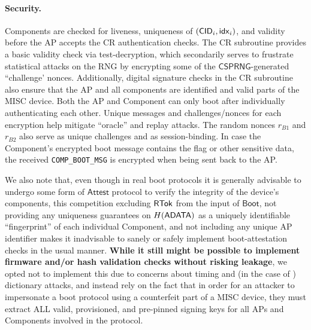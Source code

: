 \paragraph{Security.} Components are checked for liveness, uniqueness of $(\mathsf{CID}_i, \mathsf{idx}_i)$, and validity before the AP accepts the CR authentication checks. The CR subroutine provides a basic validity check via test-decryption, which secondarily serves to frustrate statistical attacks on the RNG \iflong by encrypting some of the $\mathsf{CSPRNG}$-generated ``challenge' nonces\fi. Additionally, digital signature checks in the CR subroutine also ensure that the AP and all components are identified and valid parts of the MISC device. Both the AP and Component can only boot after individually authenticating each other. Unique messages and challenges/nonces for each encryption help mitigate ``oracle'' and replay attacks. The random nonces $r_{B1}$ and $r_{B2}$ also serve as unique challenges and as session-binding. In case the Component's encrypted boot message contains the flag or other sensitive data, the received \texttt{COMP\_BOOT\_MSG} is encrypted when being sent back to the AP. 

We also note that, even though in real boot protocols it is generally advisable to undergo some form of $\mathsf{Attest}$ protocol to verify the integrity of the device's components, this competition excluding $\mathsf{RTok}$ from the input of $\mathsf{Boot}$, not providing any uniqueness guarantees on $H(\mathsf{ADATA})$ as a uniquely identifiable ``fingerprint'' of each individual Component, and not including any unique AP identifier makes it inadvisable to sanely or safely implement boot-attestation checks in the usual manner. \iflong \textbf{While it still might be possible to implement firmware and/or \adata hash validation checks without risking \adata leakage}, we opted not to implement this due to concerns about timing and (in the case of \adata) dictionary attacks, and instead rely on the fact that in order for an attacker to impersonate a boot protocol using a counterfeit part of a MISC device, they must extract ALL valid, provisioned, and pre-pinned signing keys for all APs and Components involved in the protocol.
